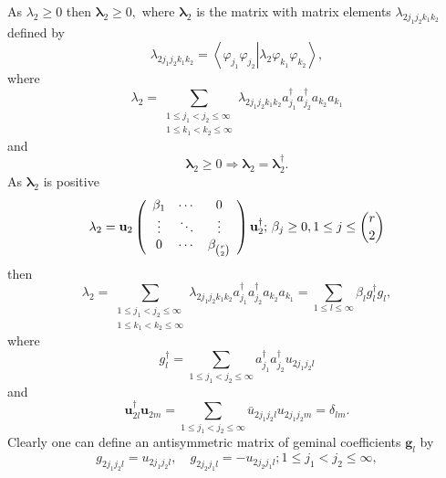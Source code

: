 \documentclass[aps,preprint]{revtex4}%
\begin{document}
As $\lambda_{2}\geq0$ then $\mathbf{\lambda}_{2}\geq0,$ where $\mathbf{\lambda
}_{2}$ is the matrix with matrix elements $\lambda_{2j_{1}j_{2}k_{1}k_{2}}$
defined by
\begin{equation}
\lambda_{2j_{1}j_{2}k_{1}k_{2}}=\left\langle \left.  \varphi_{j_{1}}%
\varphi_{j_{2}}\right\vert \lambda_{2}\varphi_{k_{1}}\varphi_{k_{2}%
}\right\rangle ,
\end{equation}
where
\begin{equation}
\lambda_{2}=\sum_{\substack{1\leq j_{1}<j_{2}\leq\infty\\1\leq k_{1}<k_{2}%
\leq\infty}}\lambda_{2j_{1}j_{2}k_{1}k_{2}}a_{j_{1}}^{\dagger}a_{j_{2}%
}^{\dagger}a_{k_{2}}a_{k_{1}}%
\end{equation}
and
\begin{equation}
\mathbf{\lambda}_{2}\geq0\Rightarrow\mathbf{\lambda}_{2}=\mathbf{\lambda}%
_{2}^{\dagger}.
\end{equation}
As $\mathbf{\lambda}_{2}$ is positive
\begin{equation}
\mathbf{\lambda}_{2}=\mathbf{u}_{2}\left(
\begin{array}
[c]{ccc}%
\beta_{1} & \cdots & 0\\
\vdots & \ddots & \vdots\\
0 & \cdots & \beta_{\binom{r}{2}}%
\end{array}
\right)  \mathbf{u}_{2}^{\dagger};\,\beta_{j}\geq0,1\leq j\leq\binom{r}{2}%
\end{equation}
then
\begin{equation}
\lambda_{2}=\sum_{\substack{1\leq j_{1}<j_{2}\leq\infty\\1\leq k_{1}<k_{2}%
\leq\infty}}\lambda_{2j_{1}j_{2}k_{1}k_{2}}a_{j_{1}}^{\dagger}a_{j_{2}%
}^{\dagger}a_{k_{2}}a_{k_{1}}=\sum_{1\leq l\leq\infty}\beta_{l}g_{l}^{\dagger
}g_{l}, \label{ProjEx}%
\end{equation}
where%
\begin{equation}
g_{l}^{\dagger}=\sum_{1\leq j_{1}<j_{2}\leq\infty}a_{j_{1}}^{\dagger}a_{j_{2}%
}^{\dagger}u_{2j_{1}j_{2}l}%
\end{equation}
and
\begin{equation}
\mathbf{u}_{2l}^{\dagger}\mathbf{u}_{2m}=\sum_{1\leq j_{1}<j_{2}\leq\infty
}\bar{u}_{2j_{1}j_{2}l}u_{2j_{1}j_{2}m}=\delta_{lm}.
\end{equation}
Clearly one can define an antisymmetric matrix of geminal coefficients
$\mathbf{g}_{l}$ by
\begin{equation}
g_{2j_{1}j_{2}l}=u_{2j_{1}j_{2}l},\quad g_{2j_{2}j_{1}l}=-u_{2j_{2}j_{1}%
l};1\leq j_{1}<j_{2}\leq\infty,
\end{equation}
\end{document}

